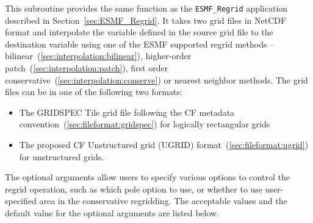    This subroutine provides the same function as the {\tt ESMF\_Regrid} application
   described in Section~\ref{sec:ESMF_Regrid}.  It takes two grid files in NetCDF format and interpolate
   the variable defined in the source grid file to the destination variable using one of the ESMF supported
   regrid methods -- bilinear~(\ref{sec:interpolation:bilinear}), higher-order patch~(\ref{sec:interpolation:patch}),
   first order conservative~(\ref{sec:interpolation:conserve}) or nearest neighbor methods.
   The grid files can be in one of the following two formats:
   \begin{itemize}
   \item The GRIDSPEC Tile grid file following the CF metadata convention~(\ref{sec:fileformat:gridspec}) for logically rectangular grids
   \item The proposed CF Unstructured grid (UGRID) format~(\ref{sec:fileformat:ugrid}) for  unstructured grids.
   \end{itemize}
   \smallskip
   The optional arguments allow users to specify various options to control the regrid operation,
   such as which pole option to use, or whether to use user-specified area in the conservative regridding.
   The acceptable values and the default value for the optional arguments are listed below.
  
